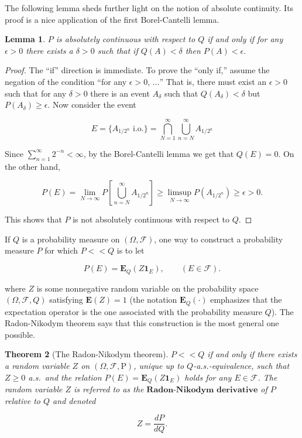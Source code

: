 \documentclass[11pt]{report}
\theoremstyle{plain}
\newtheorem{thm}{Theorem}[chapter]
\newtheorem{lem}[thm]{Lemma}
\theoremstyle{definition}
\begin{document}
The following lemma sheds further light on the notion of absolute continuity. Its proof is a nice application of the first Borel-Cantelli lemma.

\begin{lem}
\label{lem-abs-cont}
$P$ is absolutely continuous with respect to $Q$ if and only if for any $\epsilon>0$ there exists a $\delta>0$ such that if $Q(A)<\delta$ then $P(A)<\epsilon$.
\end{lem}

\begin{proof}
The ``if'' direction is immediate. To prove the ``only if,'' assume the negation of the condition ``for any $\epsilon>0$, $\ldots$'' That is, there must exist an $\epsilon>0$ such that for any $\delta>0$ there is an event $A_\delta$ such that $Q(A_\delta)< \delta$ but $P(A_\delta)\ge\epsilon$. Now consider the event

\[
E= \{ A_{1/{2^n}}\textrm{ i.o.} \} =  \bigcap_{N=1}^\infty \bigcup_{n=N}^\infty A_{1/2^n}
\]

Since $\sum_{n=1}^\infty 2^{-n}<\infty$, by the Borel-Cantelli lemma we get that $Q(E)=0$. On the other hand,

\[
P(E) = \lim_{N\to\infty} P\left[\bigcup_{n=N}^\infty A_{1/2^n}\right] \ge \limsup_{N\to\infty} P(A_{1/2^n}) \ge \epsilon>0.
\]

This shows that $P$ is not absolutely continuous with respect to $Q$.
\end{proof}

If $Q$ is a probability measure on $(\Omega, \mathcal{F})$, one way to construct a probability measure $P$ for which $P<<Q$ is to let

\begin{equation*} \tag{5}\label{eq:abs-cont-p-q}
P(E) = \mathbf{E}_{Q}(Z \mathbf{1}_E), \qquad (E\in \mathcal{F}).
\end{equation*}

where $Z$ is some nonnegative random variable on the probability space $(\Omega,\mathcal{F},Q)$ satisfying $\mathbf{E}(Z)=1$ (the notation $\mathbf{E}_{Q}(\cdot)$ emphasizes that the expectation operator is the one associated with the probability measure $Q$). The Radon-Nikodym theorem says that this construction is the most general one possible.

\begin{thm}[The Radon-Nikodym theorem]
$P<<Q$ if and only if there exists a random variable $Z$ on $(\Omega, \mathcal{F}, \mathrm{P})$, unique up to $Q$-a.s.-equivalence, such that $Z\ge 0$ a.s.\ and the relation $P(E) = \mathbf{E}_{Q} (Z \mathbf{1}_E)$ holds for any $E\in \mathcal{F}$. The random variable $Z$ is referred to as the $\textbf{Radon-Nikodym derivative}$ of $P$ relative to $Q$ and denoted

\[
Z = \frac{dP}{dQ}.
\]

\end{thm}
\end{document}
